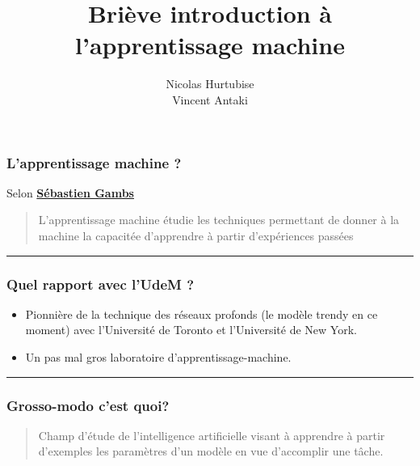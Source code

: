\documentclass[french]{beamer}
\title[Intro-ML]{Briève introduction à l'apprentissage machine} %
\author{Nicolas Hurtubise \\
Vincent Antaki} %
\institute[UdeM] %
{
*Ou introduction aux modèles d'apprentissages non-paramétrés \\ %
\medskip
\textit{hurtubin@iro.umontreal.ca
\\antakivi@iro.umontreal.ca} %
}
\date{} %
\begin{document}
\begin{frame}
\titlepage %
\end{frame}



\begin{frame}
\frametitle{L'apprentissage machine ?}

Selon \textbf{\href{http://www.iro.umontreal.ca/~aimeur/cours/ift6261/Survol_apprentissage_machine.pdf}{Sébastien
Gambs}}

\begin{quote}
L'apprentissage machine étudie les techniques permettant de donner à la machine la capacitée d'apprendre à partir d'expériences passées
\end{quote}
\begin{center}\rule{3in}{0.4pt}\end{center}
\end{frame}

\begin{frame}
\frametitle{Quel rapport avec l'UdeM ?}

\begin{itemize}
\item Pionnière de la technique des réseaux profonds (le modèle trendy en ce moment) avec l'Université de Toronto et l'Université de New York.
\item Un pas mal gros laboratoire d'apprentissage-machine.
\end{itemize}

\begin{center}\rule{3in}{0.4pt}\end{center}

\end{frame}


\begin{frame}
\frametitle{Grosso-modo c'est quoi?}

\begin{quote}
Champ d'étude de l'intelligence artificielle visant à apprendre à partir d'exemples les paramètres d'un modèle en vue d'accomplir une tâche.
\end{quote}
\end{frame}
\end{document}
